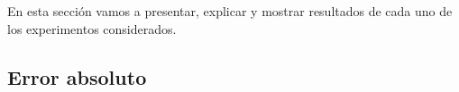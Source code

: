En esta sección vamos a presentar, explicar y mostrar resultados de cada uno de los experimentos considerados.

\subsection{Error absoluto}

